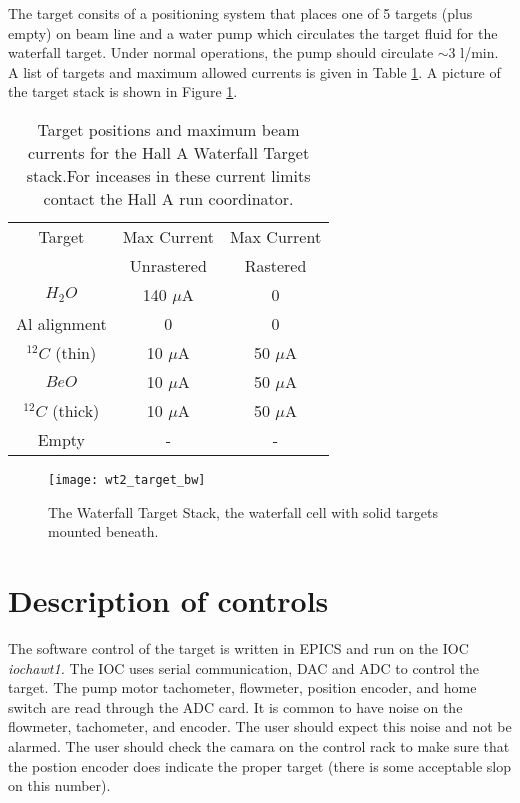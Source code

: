 The target consits of a positioning system that places one of 5 targets
(plus empty) on beam line and a water pump which circulates the target
fluid for the waterfall target. Under normal operations, the pump
should circulate $\sim 3$ l/min. A list of targets and maximum allowed
currents is given in Table \ref{tab: target-list}. A picture of the
target stack is shown in Figure \ref{fig: wt_target-stack}.%
\begin{table}
\begin{center}\begin{tabular}{|c|c|c|}
\hline 
Target&
Max Current&
Max Current\\
&
Unrastered&
Rastered\\
\hline
\hline 
$H_{2}O$&
140 $\mu $A&
0\\
\hline
Al alignment&
0&
0\\
\hline
$^{12}C$ (thin)&
10 $\mu $A&
50 $\mu $A\\
\hline
$BeO$&
10 $\mu $A&
50 $\mu $A\\
\hline
$^{12}C$ (thick)&
10 $\mu $A&
50 $\mu $A\\
\hline
Empty&
-&
-\\
\hline
\end{tabular}\end{center}


\caption{Target positions and maximum beam currents for the Hall A Waterfall
Target stack.\label{tab: target-list} For inceases in these current
limits contact the Hall A run coordinator.}
\end{table}
%
\begin{figure}
\begin{center}\texttt{[image: wt2\_target\_bw]}\end{center}


\caption{The Waterfall Target Stack, the waterfall cell with solid targets 
mounted beneath\label{fig: wt_target-stack}.}
\end{figure}



\section{Description of controls}

The software control of the target is written in EPICS and run on
the IOC \textit{iochawt1.} The IOC uses serial communication, DAC
and ADC to control the target. The pump motor tachometer, flowmeter,
position encoder, and home switch are read through the ADC card. It
is common to have noise on the flowmeter, tachometer, and encoder.
The user should expect this noise and not be alarmed. The user should
check the camara on the control rack to make sure that the postion
encoder does indicate the proper target (there is some acceptable
slop on this number).

